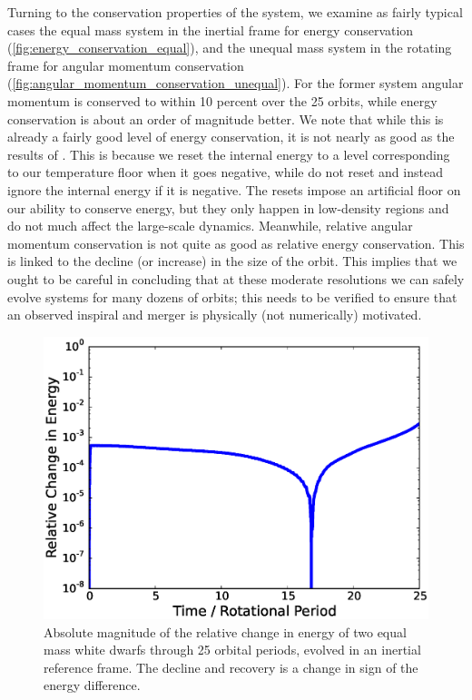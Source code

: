 \documentclass[12pt]{article}
\begin{document}
Turning to the conservation properties of the system, we examine as
fairly typical cases the equal mass system in the inertial frame for
energy conservation (\autoref{fig:energy_conservation_equal}), and the
unequal mass system in the rotating frame for angular momentum
conservation (\autoref{fig:angular_momentum_conservation_unequal}).
For the former system angular momentum is conserved to within 10 percent over the 25
orbits, while energy conservation is about an order of magnitude
better. We note that while this is already a fairly good level of
energy conservation, it is not nearly as good as the results of
\citet{marcello:2012}. This is because we reset the internal energy to
a level corresponding to our temperature floor when it goes negative,
while \citeauthor{marcello:2012} do not reset and instead ignore the
internal energy if it is negative. The resets impose an artificial
floor on our ability to conserve energy, but they only happen in
low-density regions and do not much affect the large-scale dynamics.
Meanwhile, relative angular momentum conservation is not quite as good
as relative energy conservation.  This is
linked to the decline (or increase) in the size of the orbit. This
implies that we ought to be careful in concluding that at these
moderate resolutions we can safely evolve systems for many dozens of
orbits; this needs to be verified to ensure that an observed inspiral
and merger is physically (not numerically) motivated.

\begin{figure}[h!]
  \centering
  \includegraphics[scale=0.8,trim=0.1in 0.0in 0.1in 0.1in,clip]{plots/equal_energy_rot0}
  \caption[System energy over 25 orbital periods]
          {Absolute magnitude of the relative change in energy of two equal mass white dwarfs through 25 orbital periods,
           evolved in an inertial reference frame. The decline and recovery is a change in sign of the energy difference.
           \label{fig:energy_conservation_equal}}
\end{figure}
\end{document}
